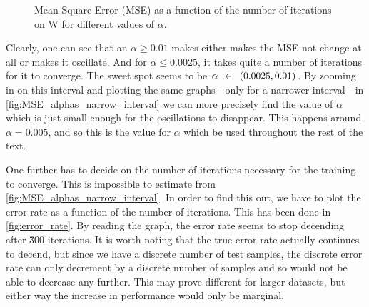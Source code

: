 \documentclass{article}
\begin{document}
\begin{figure}
    \centering
    \caption{Mean Square Error (MSE) as a function of the number of iterations on W for different values
    of $\alpha$.}
\end{figure}

Clearly, one can see that an $\alpha \geq 0.01$ makes either makes the MSE not change at all
or makes it oscillate. And for $\alpha \leq 0.0025$, it takes quite a number of iterations
for it to converge. The sweet spot seems to be $\alpha \enskip \in \enskip ( 0.0025, 0.01)$.
By zooming in on this interval and plotting the same graphs - only for a narrower interval - in
\autoref{fig:MSE_alphas_narrow_interval} we can more precisely find the value of $\alpha$ which
is just small enough for the oscillations to disappear. This happens around $\alpha = 0.005$,
and so this is the value for $\alpha$ which be used throughout the rest of the text.

One further has to decide on the number of iterations necessary for the training to converge. This
is impossible to estimate from \autoref{fig:MSE_alphas_narrow_interval}. In order to find this out,
we have to plot the error rate as a function of the number of iterations. This has been done in
\autoref{fig:error_rate}. By reading the graph, the error rate seems to stop
decending after \~300 iterations. It is worth noting that the true error rate actually continues to
decend, but since we have a discrete number of test samples, the discrete error rate can only decrement
by a discrete number of samples and so would not be able to decrease any further. This may prove
different for larger datasets, but either way the increase in performance would only be marginal.
\end{document}
